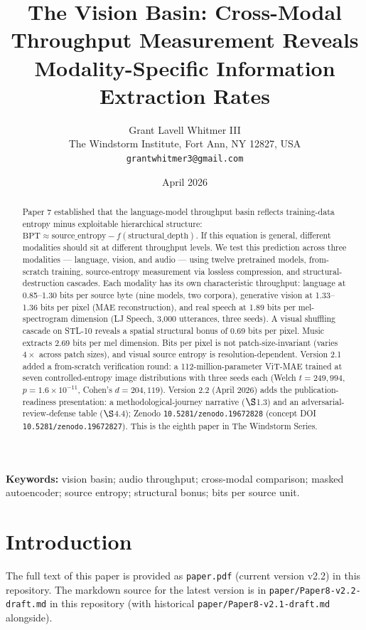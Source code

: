 \documentclass[12pt,a4paper]{article}
\title{The Vision Basin: Cross-Modal Throughput Measurement Reveals Modality-Specific Information Extraction Rates}
\author{Grant Lavell Whitmer III\\
The Windstorm Institute, Fort Ann, NY 12827, USA\\
\texttt{grantwhitmer3@gmail.com}}
\date{April 2026}
\begin{document}
\maketitle

\begin{abstract}
Paper 7 established that the language-model throughput basin reflects training-data entropy minus exploitable hierarchical structure: $\mathrm{BPT} \approx \mathrm{source\_entropy} - f(\mathrm{structural\_depth})$. If this equation is general, different modalities should sit at different throughput levels. We test this prediction across three modalities --- language, vision, and audio --- using twelve pretrained models, from-scratch training, source-entropy measurement via lossless compression, and structural-destruction cascades. Each modality has its own characteristic throughput: language at 0.85--1.30 bits per source byte (nine models, two corpora), generative vision at 1.33--1.36 bits per pixel (MAE reconstruction), and real speech at 1.89 bits per mel-spectrogram dimension (LJ Speech, 3{,}000 utterances, three seeds). A visual shuffling cascade on STL-10 reveals a spatial structural bonus of 0.69 bits per pixel. Music extracts 2.69 bits per mel dimension. Bits per pixel is not patch-size-invariant (varies $4\times$ across patch sizes), and visual source entropy is resolution-dependent. Version 2.1 added a from-scratch verification round: a 112-million-parameter ViT-MAE trained at seven controlled-entropy image distributions with three seeds each (Welch $t = 249{,}994$, $p = 1.6 \times 10^{-11}$, Cohen's $d = 204{,}119$). Version 2.2 (April 2026) adds the publication-readiness presentation: a methodological-journey narrative ($\S$1.3) and an adversarial-review-defense table ($\S$4.4); Zenodo \texttt{10.5281/zenodo.19672828} (concept DOI \texttt{10.5281/zenodo.19672827}). This is the eighth paper in The Windstorm Series.
\end{abstract}

\noindent\textbf{Keywords:} vision basin; audio throughput; cross-modal comparison; masked autoencoder; source entropy; structural bonus; bits per source unit.

\section{Introduction}

The full text of this paper is provided as \texttt{paper.pdf} (current version v2.2) in this repository. The markdown source for the latest version is in \texttt{paper/Paper8-v2.2-draft.md} in this repository (with historical \texttt{paper/Paper8-v2.1-draft.md} alongside).
\end{document}
